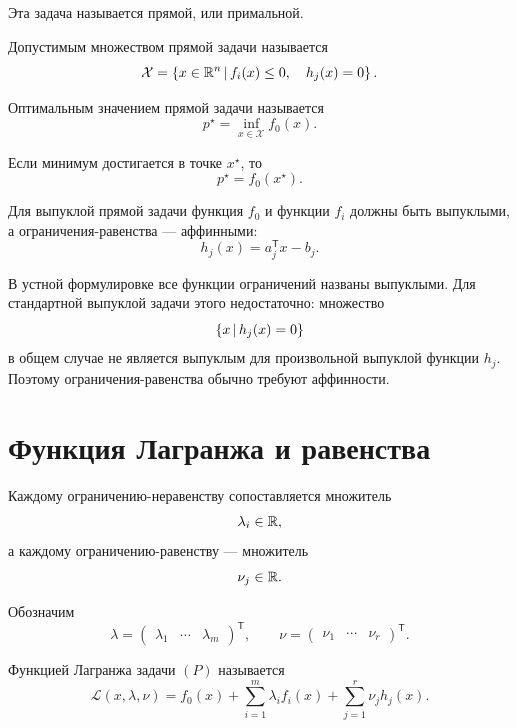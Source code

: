 Эта задача называется прямой, или примальной.

\begin{definition}
Допустимым множеством прямой задачи называется
\[
    \mathcal X
    =
    \left\{
        x\in\mathbb{R}^n
        \,\middle|\,
        f_i(x)\le0,\quad
        h_j(x)=0
    \right\}.
\]
\end{definition}

\begin{definition}
Оптимальным значением прямой задачи называется
\[
    p^\star
    =
    \inf_{x\in\mathcal X}f_0(x).
\]
\end{definition}

Если минимум достигается в точке \(x^\star\), то
\[
    p^\star=f_0(x^\star).
\]

Для выпуклой прямой задачи функция \(f_0\) и функции
\(f_i\) должны быть выпуклыми, а ограничения-равенства ---
аффинными:
\[
    h_j(x)=a_j^{\mathsf T}x-b_j.
\]

\begin{remark}
В устной формулировке все функции ограничений названы выпуклыми.
Для стандартной выпуклой задачи этого недостаточно: множество
\[
    \left\{ x \,\middle|\, h_j(x)=0 \right\}
\]
в общем случае не является выпуклым для произвольной выпуклой
функции \(h_j\). Поэтому ограничения-равенства обычно требуют
аффинности.
\end{remark}

\section{Функция Лагранжа и равенства}

Каждому ограничению-неравенству сопоставляется множитель
\[
    \lambda_i\in\mathbb{R},
\]
а каждому ограничению-равенству --- множитель
\[
    \nu_j\in\mathbb{R}.
\]

Обозначим
\[
    \lambda=
    \begin{pmatrix}
        \lambda_1&\cdots&\lambda_m
    \end{pmatrix}^{\mathsf T},
    \qquad
    \nu=
    \begin{pmatrix}
        \nu_1&\cdots&\nu_r
    \end{pmatrix}^{\mathsf T}.
\]

\begin{definition}
Функцией Лагранжа задачи \((P)\) называется
\[
    \mathcal L(x,\lambda,\nu)
    =
    f_0(x)
    +
    \sum_{i=1}^{m}\lambda_i f_i(x)
    +
    \sum_{j=1}^{r}\nu_j h_j(x).
\]
\end{definition}

